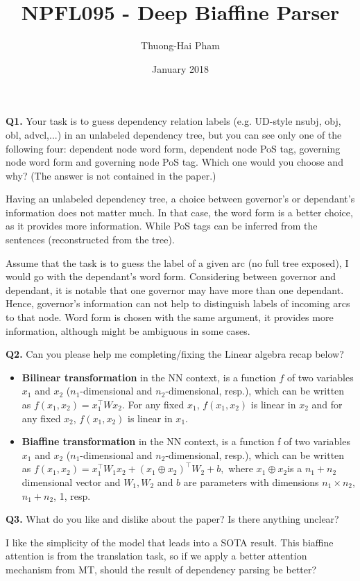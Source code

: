 \documentclass{article}
\title{NPFL095 - Deep Biaffine Parser}
\author{Thuong-Hai Pham}
\date{January 2018}
\begin{document}
\maketitle

\textbf{Q1.} Your task is to guess dependency relation labels (e.g. UD-style nsubj, obj, obl, advcl,...) in an unlabeled dependency tree, but you can see only one of the following four: dependent node word form, dependent node PoS tag, governing node word form and governing node PoS tag. Which one would you choose and why? (The answer is not contained in the paper.)

Having an unlabeled dependency tree, a choice between governor's or dependant's information does not matter much. In that case, the word form is a better choice, as it provides more information. While PoS tags can be inferred from the sentences (reconstructed from the tree).

Assume that the task is to guess the label of a given arc (no full tree exposed), I would go with the dependant's word form. Considering between governor and dependant, it is notable that one governor may have more than one dependant. Hence, governor's information can not help to distinguish labels of incoming arcs to that node. Word form is chosen with the same argument, it provides more information, although might be ambiguous in some cases.

\bigskip

\textbf{Q2.} Can you please help me completing/fixing the Linear algebra recap below?

\begin{itemize}
    \item \textbf{Bilinear transformation} in the NN context, is a function $f$ of two variables $x_1$ and $x_2$ ($n_1$-dimensional and $n_2$-dimensional, resp.), which can be written as $f(x_1, x_2)=x_1^\intercal W x_2$. For any fixed $x_1$, $f(x_1, x_2)$ is linear in $x_2$ and for any fixed $x_2$, $f(x_1, x_2)$ is linear in $x_1$.

    \item \textbf{Biaffine transformation} in the NN context, is a function f of two variables $x_1$ and $x_2$ ($n_1$-dimensional and $n_2$-dimensional, resp.), which can be written as $f(x_1, x_2) = x_1^\intercal W_1 x_2 + (x_1\oplus x_2)^\intercal W_2 + b,$ where $x_1 \oplus x_2 $is a $n_1+n_2$ dimensional vector and $W_1, W_2$ and $b$ are parameters with dimensions $n_1\times n_2$, $n_1+n_2$, 1, resp.

\end{itemize}

\bigskip

\textbf{Q3.} What do you like and dislike about the paper? Is there anything unclear?

I like the simplicity of the model that leads into a SOTA result. This biaffine attention is from the translation task, so if we apply a better attention mechanism from MT, should the result of dependency parsing be better?
\end{document}

